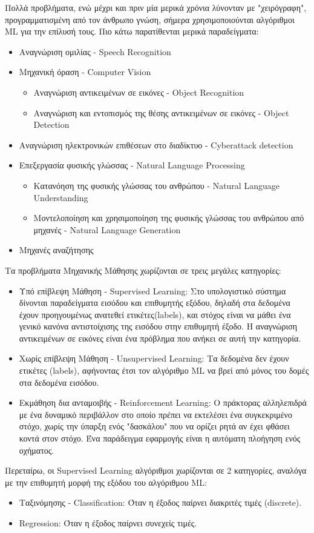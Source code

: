 Πολλά προβλήματα, ενώ μέχρι και πριν μία μερικά χρόνια λύνονταν με
"χειρόγραφη", προγραμματισμένη από τον άνθρωπο γνώση, σήμερα χρησιμοποιούνται
αλγόριθμοι ML για την επίλυσή τους. Πιο κάτω παρατίθενται μερικά
παραδείγματα:
\begin{itemize}
  \item{Αναγνώριση ομιλίας - Speech Recognition}
  \item{Μηχανική όραση - Computer Vision}
  \begin{itemize}
    \item{Αναγνώριση αντικειμένων σε εικόνες - Object Recognition}
    \item{Αναγνώριση και εντοπισμός της θέσης αντικειμένων σε εικόνες - Object Detection}
  \end{itemize}
  \item{Αναγνώριση ηλεκτρονικών επιθέσεων στο διαδίκτυο - Cyberattack detection}
  \item{Επεξεργασία φυσικής γλώσσας - Natural Language Processing}
  \begin{itemize}
    \item{Κατανόηση της φυσικής γλώσσας του ανθρώπου - Natural Language Understanding}
    \item{Μοντελοποίηση και χρησιμοποίηση της φυσικής γλώσσας του ανθρώπου από μηχανές - Natural Language Generation}
  \end{itemize}
  \item{Μηχανές αναζήτησης}
\end{itemize}

Τα προβλήματα Μηχανικής Μάθησης χωρίζονται σε τρεις μεγάλες κατηγορίες:
\begin{itemize}
  \item{Υπό επίβλεψη Μάθηση - Supervised Learning:
      Στο υπολογιστικό σύστημα δίνονται παραδείγματα εισόδου και επιθυμητής εξόδου,
      δηλαδή στα δεδομένα έχουν προηγουμένως ανατεθεί ετικέτες(labels),
      και στόχος είναι να μάθει ένα γενικό κανόνα αντιστοίχισης της εισόδου στην επιθυμητή έξοδο.
      Η αναγνώριση αντικειμένων σε εικόνες είναι ένα πρόβλημα που ανήκει σε αυτή την κατηγορία.
    }
  \item{Χωρίς επίβλεψη Μάθηση - Unsupervised Learning:
      Τα δεδομένα δεν έχουν ετικέτες (labels), αφήνοντας έτσι τον αλγόριθμο ML να βρεί
      από μόνος του δομές στα δεδομένα εισόδου.
    }
  \item{Εκμάθηση δια ανταμοιβής - Reinforcement Learning:
      Ο πράκτορας αλληλεπιδρά με ένα δυναμικό περιβάλλον στο οποίο πρέπει να
      εκτελέσει ένα συγκεκριμένο στόχο, χωρίς την ύπαρξη ενός "δασκάλου" που να
      ορίζει ρητά αν έχει φθάσει κοντά στον στόχο. Ένα παράδειγμα εφαρμογής
      είναι η αυτόματη πλοήγηση ενός οχήματος.
    }
\end{itemize}
Περεταίρω, οι Supervised Learning αλγόριθμοι χωρίζονται σε 2 κατηγορίες, αναλόγα
με την επιθυμητή μορφή της εξόδου του αλγόριθμου ML:
\begin{itemize}
  \item{Ταξινόμησης - Classification: Όταν η έξοδος παίρνει διακριτές τιμές (discrete).}
  \item{Regression: Όταν η έξοδος παίρνει συνεχείς τιμές.}
\end{itemize}


